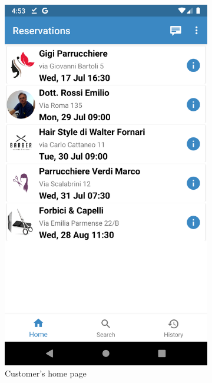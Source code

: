 \begin{figure}[h]
\centering
\begin{subfigure}{.5\textwidth}
  \centering
  \includegraphics[height=.4\textheight, keepaspectratio=true]{Img/Screens/Customer_Home}
  \caption{Customer's home page}
\end{subfigure}%
\begin{subfigure}{.5\textwidth}
  \centering

\end{subfigure}
\end{figure}
